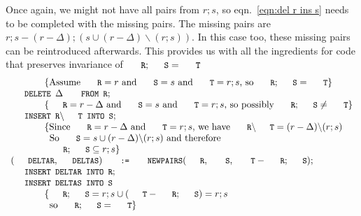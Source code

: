 \documentclass{svproc}
\begin{document}
	Once again, we might not have all pairs from $r;s$,
	so eqn.~\ref{eqn:del r ins s} needs to be completed with the missing pairs.
	The missing pairs are $r;s-(r-\Delta);(s\cup(r-\Delta)\backslash(r;s))$.
	In this case too, these missing pairs can be reintroduced afterwards.
	This provides us with all the ingredients for code that preserves invariance of $\code{R};\code{S}=\code{T}$
\[\begin{array}{l}
\hspace{0.5in}\{\text{Assume }\code{R}=r\text{ and }\code{S}=s\text{ and }\code{T}=r;s\text{, so }\code{R};\code{S}=\code{T}\}\\
\code{DELETE }\Delta\code{ FROM R};\\
\hspace{0.5in}\{\code{R}=r-\Delta\text{ and }\code{S}=s\text{ and }\code{T}=r;s\text{, so possibly }\code{R};\code{S}\neq\code{T}\}\\
\code{INSERT R}\backslash\code{T INTO S};\\
\hspace{0.5in}\{\text{Since }\code{R}=r-\Delta\text{ and }\code{T}=r;s\text{, we have }\code{R}\backslash\code{T}=(r-\Delta)\backslash(r;s)\\
\hspace{0.575in}\text{So }\code{S}=s\cup(r-\Delta)\backslash(r;s)\text{ and therefore}\\
\hspace{0.575in}\code{R};\code{S}\subs r;s\}\\
(\code{DELTAR},\code{DELTAS})\code{ := }\code{NEWPAIRS}(\code{R},\ \code{S},\ \code{T}-\code{R};\code{S});\\
\code{INSERT DELTAR INTO R};\\
\code{INSERT DELTAS INTO S}\\
\hspace{0.5in}\{\code{R};\code{S}=r;s\cup(\code{T}-\code{R};\code{S})=r;s\\
\hspace{0.575in}\text{so }\code{R};\code{S}=\code{T}\}
\end{array}\]
\end{document}

